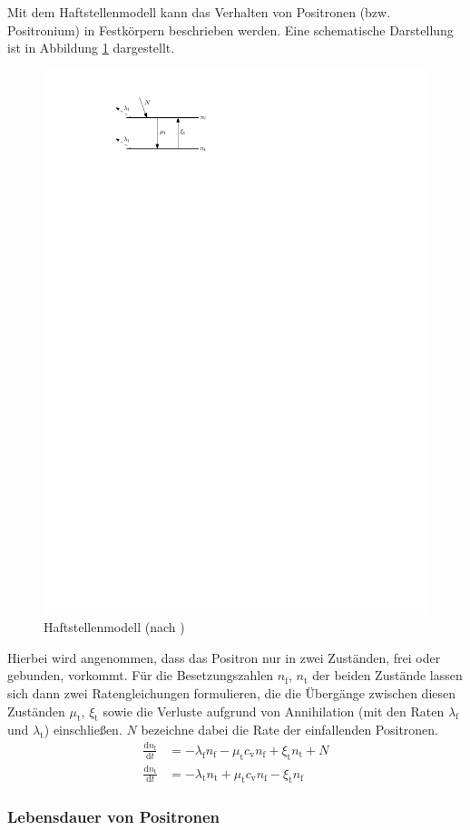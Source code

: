 \documentclass[11pt, a4paper]{article}
\numberwithin{equation}{section}
\begin{document}
Mit dem Haftstellenmodell kann das Verhalten von Positronen (bzw. Positronium) in Festkörpern beschrieben werden.
Eine schematische Darstellung ist in Abbildung \ref{fig:trapping_model} dargestellt.
\begin{figure}[htbp]
	\centering
	\includegraphics[width=.5\textwidth]{./figures/trapping_model}
	\caption{Haftstellenmodell (nach \cite{schatz})}
	\label{fig:trapping_model}
\end{figure}
Hierbei wird angenommen, dass das Positron nur in zwei Zuständen, frei oder gebunden, vorkommt.
Für die Besetzungszahlen $n_\mathrm{f}$, $n_\mathrm{t}$ der beiden Zustände lassen sich dann zwei Ratengleichungen formulieren, die die Übergänge zwischen diesen Zuständen $\mu_\mathrm{t}$, $\xi_\mathrm{t}$ sowie die Verluste aufgrund von Annihilation (mit den Raten $\lambda_\mathrm{f}$ und $\lambda_\mathrm{t}$) einschließen.
$N$ bezeichne dabei die Rate der einfallenden Positronen.
\begin{align}
	\frac{\mathrm{d}n_\mathrm{f}}{\mathrm{d}t}&=-\lambda_\mathrm{f}n_\mathrm{f}-\mu_\mathrm{t}c_\mathrm{v}n_\mathrm{f} + \xi_\mathrm{t}n_\mathrm{t} + N \\
	\frac{\mathrm{d}n_\mathrm{t}}{\mathrm{d}t}&=-\lambda_\mathrm{t}n_\mathrm{t}+\mu_\mathrm{t}c_\mathrm{v}n_\mathrm{f} - \xi_\mathrm{t}n_\mathrm{f}
\end{align}

\subsubsection{Lebensdauer von Positronen}
\end{document}
